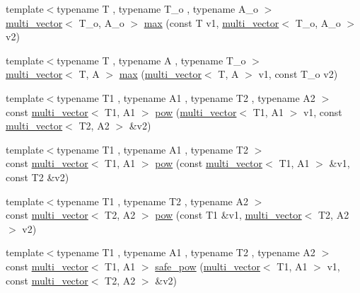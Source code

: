 \begin{DoxyCompactItemize}
\item 
{\footnotesize template$<$typename T , typename T\-\_\-o , typename A\-\_\-o $>$ }\\\hyperlink{classIceBRG_1_1multi__vector}{multi\-\_\-vector}$<$ T\-\_\-o, A\-\_\-o $>$ \hyperlink{namespaceIceBRG_aaaa561d241312f48ff79afd0c8023361}{max} (const T v1, \hyperlink{classIceBRG_1_1multi__vector}{multi\-\_\-vector}$<$ T\-\_\-o, A\-\_\-o $>$ v2)
\item 
{\footnotesize template$<$typename T , typename A , typename T\-\_\-o $>$ }\\\hyperlink{classIceBRG_1_1multi__vector}{multi\-\_\-vector}$<$ T, A $>$ \hyperlink{namespaceIceBRG_a223be429a666e2ef2ca22c26ea8e5f19}{max} (\hyperlink{classIceBRG_1_1multi__vector}{multi\-\_\-vector}$<$ T, A $>$ v1, const T\-\_\-o v2)
\item 
{\footnotesize template$<$typename T1 , typename A1 , typename T2 , typename A2 $>$ }\\const \hyperlink{classIceBRG_1_1multi__vector}{multi\-\_\-vector}$<$ T1, A1 $>$ \hyperlink{namespaceIceBRG_a2be9de849c61ce02aba5477f4792391c}{pow} (\hyperlink{classIceBRG_1_1multi__vector}{multi\-\_\-vector}$<$ T1, A1 $>$ v1, const \hyperlink{classIceBRG_1_1multi__vector}{multi\-\_\-vector}$<$ T2, A2 $>$ \&v2)
\item 
{\footnotesize template$<$typename T1 , typename A1 , typename T2 $>$ }\\const \hyperlink{classIceBRG_1_1multi__vector}{multi\-\_\-vector}$<$ T1, A1 $>$ \hyperlink{namespaceIceBRG_aa4e163dd2a9d355e27dbd2450eece323}{pow} (const \hyperlink{classIceBRG_1_1multi__vector}{multi\-\_\-vector}$<$ T1, A1 $>$ \&v1, const T2 \&v2)
\item 
{\footnotesize template$<$typename T1 , typename T2 , typename A2 $>$ }\\const \hyperlink{classIceBRG_1_1multi__vector}{multi\-\_\-vector}$<$ T2, A2 $>$ \hyperlink{namespaceIceBRG_aa64d6be7b7c668b8ec3afe185a9bbe45}{pow} (const T1 \&v1, \hyperlink{classIceBRG_1_1multi__vector}{multi\-\_\-vector}$<$ T2, A2 $>$ v2)
\item 
{\footnotesize template$<$typename T1 , typename A1 , typename T2 , typename A2 $>$ }\\const \hyperlink{classIceBRG_1_1multi__vector}{multi\-\_\-vector}$<$ T1, A1 $>$ \hyperlink{namespaceIceBRG_a9c3ecdd0b11c370f8d575bd9368687af}{safe\-\_\-pow} (\hyperlink{classIceBRG_1_1multi__vector}{multi\-\_\-vector}$<$ T1, A1 $>$ v1, const \hyperlink{classIceBRG_1_1multi__vector}{multi\-\_\-vector}$<$ T2, A2 $>$ \&v2)

\end{DoxyCompactItemize}
